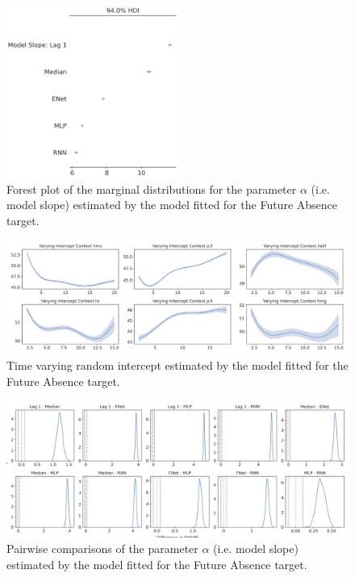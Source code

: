 \begin{figure}[H]
\centering
\includegraphics[width=0.5\textwidth]{images/appendix_C/Future Absence_models_2.png}
\caption[\textbf{Future absence model fixed effect}]{Forest plot of the marginal distributions for the parameter $\alpha$ (i.e. model slope) estimated by the model fitted for the Future Absence target.}
\label{model_abs_2}
\end{figure}

\begin{figure}[H]
\centering
\includegraphics[width=\textwidth]{images/appendix_C/Future Absence_interc_2.png}
\caption[\textbf{Future absence time-varying random intercept}]{Time varying random intercept estimated by the model fitted for the Future Absence target.}
\label{interc_abs_2}
\end{figure}

\begin{figure}[H]
\centering
\includegraphics[width=\textwidth]{images/appendix_C/Future_Absence_comp_2.png}
\caption[\textbf{Future absence pairwise comparisons of model fixed effect}]{Pairwise comparisons of the parameter $\alpha$ (i.e. model slope) estimated by the model fitted for the Future Absence target.}
\label{comp_abs_2}
\end{figure}


